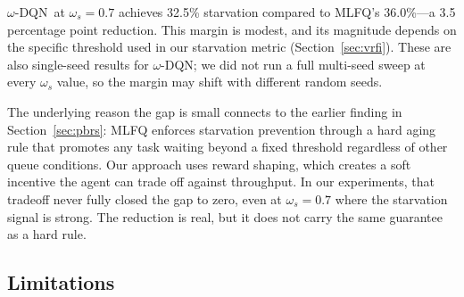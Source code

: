 \documentclass[10pt,twocolumn]{article}
\theoremstyle{remark}
\newcommand{\omegadqn}{$\omega$-DQN}
\begin{document}
\omegadqn\ at $\omega_s=0.7$ achieves 32.5\% starvation compared to
MLFQ's 36.0\%---a 3.5 percentage point reduction. This margin is
modest, and its magnitude depends on the specific threshold used in
our starvation metric (Section~\ref{sec:vrfi}). These are also
single-seed results for \omegadqn; we did not run a full multi-seed
sweep at every $\omega_s$ value, so the margin may shift with
different random seeds.

The underlying reason the gap is small connects to the earlier
finding in Section~\ref{sec:pbrs}: MLFQ enforces starvation
prevention through a hard aging rule that promotes any task waiting
beyond a fixed threshold regardless of other queue conditions. Our
approach uses reward shaping, which creates a soft incentive the
agent can trade off against throughput. In our experiments, that
tradeoff never fully closed the gap to zero, even at $\omega_s=0.7$
where the starvation signal is strong. The reduction is real, but it
does not carry the same guarantee as a hard rule.

\subsection{Limitations}
\end{document}

